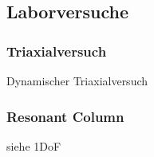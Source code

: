 \subsection{Laborversuche}


\begin{frame}
\frametitle{Triaxialversuch}

Dynamischer Triaxialversuch
\end{frame}


\begin{frame}
\frametitle{Resonant Column}

siehe 1DoF
\end{frame}
